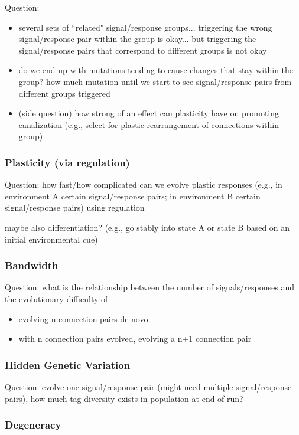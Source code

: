 Question:
\begin{itemize}
\item several sets of ``related" signal/response groups... triggering the wrong signal/response pair within the group is okay... but triggering the signal/response pairs that correspond to different groups is not okay
\item do we end up with mutations tending to cause changes that stay within the group? how much mutation until we start to see signal/response pairs from different groups triggered
\item (side question) how strong of an effect can plasticity have on promoting canalization (e.g., select for plastic rearrangement of connections within group)
\end{itemize}

\subsubsection{Plasticity (via regulation)}

Question: how fast/how complicated can we evolve plastic responses (e.g., in environment A certain signal/response pairs; in environment B certain signal/response pairs) using regulation

maybe also differentiation?
(e.g., go stably into state A or state B based on an initial environmental cue)

\subsubsection{Bandwidth}

Question: what is the relationship between the number of signals/responses and the evolutionary difficulty of
\begin{itemize}
\item evolving n connection pairs de-novo
\item with n connection pairs evolved, evolving a n+1 connection pair
\end{itemize}

\subsubsection{Hidden Genetic Variation}

Question: evolve one signal/response pair (might need multiple signal/response pairs), how much tag diversity exists in population at end of run?

\subsubsection{Degeneracy}


